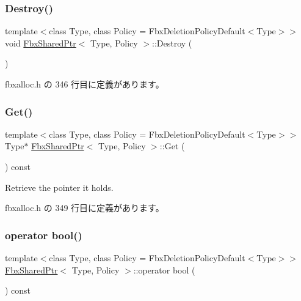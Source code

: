 \subsubsection{\texorpdfstring{Destroy()}{Destroy()}}
{\footnotesize\ttfamily template$<$class Type, class Policy = Fbx\+Deletion\+Policy\+Default$<$\+Type$>$$>$ \\
void \hyperlink{class_fbx_shared_ptr}{Fbx\+Shared\+Ptr}$<$ Type, Policy $>$\+::Destroy (\begin{DoxyParamCaption}{ }\end{DoxyParamCaption})\hspace{0.3cm}{\ttfamily [inline]}}



 fbxalloc.\+h の 346 行目に定義があります。

\mbox{\label{class_fbx_shared_ptr_a3bc4c8f7e69da6a3f53157a895ee345e}} 
\subsubsection{\texorpdfstring{Get()}{Get()}}
{\footnotesize\ttfamily template$<$class Type, class Policy = Fbx\+Deletion\+Policy\+Default$<$\+Type$>$$>$ \\
Type$\ast$ \hyperlink{class_fbx_shared_ptr}{Fbx\+Shared\+Ptr}$<$ Type, Policy $>$\+::Get (\begin{DoxyParamCaption}{ }\end{DoxyParamCaption}) const\hspace{0.3cm}{\ttfamily [inline]}}



Retrieve the pointer it holds. 



 fbxalloc.\+h の 349 行目に定義があります。

\mbox{\label{class_fbx_shared_ptr_a5e33203c68a6b6afe36eab50c491ff95}} 
\subsubsection{\texorpdfstring{operator bool()}{operator bool()}}
{\footnotesize\ttfamily template$<$class Type, class Policy = Fbx\+Deletion\+Policy\+Default$<$\+Type$>$$>$ \\
\hyperlink{class_fbx_shared_ptr}{Fbx\+Shared\+Ptr}$<$ Type, Policy $>$\+::operator bool (\begin{DoxyParamCaption}{ }\end{DoxyParamCaption}) const\hspace{0.3cm}{\ttfamily [inline]}}



